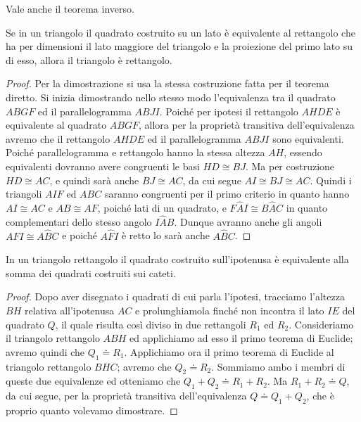 Vale anche il teorema inverso.
\begin{teorema}
Se in un triangolo il quadrato costruito su un lato è equivalente al rettangolo che ha per dimensioni il lato maggiore del triangolo e la proiezione del primo lato su di esso, allora il triangolo è rettangolo.
\end{teorema}

\begin{proof}
Per la dimostrazione si usa la stessa costruzione fatta per il teorema diretto. Si inizia dimostrando nello stesso modo l'equivalenza tra il quadrato $ABGF$ ed il parallelogramma $ABJI$. Poiché per ipotesi il rettangolo $AHDE$ è equivalente al quadrato $ABGF$, allora per la proprietà transitiva dell'equivalenza avremo che il rettangolo $AHDE$ ed il parallelogramma $ABJI$ sono equivalenti. Poiché parallelogramma e rettangolo hanno la stessa altezza $AH$, essendo equivalenti dovranno avere congruenti le basi $HD\cong BJ$. Ma per costruzione $HD\cong AC$, e quindi sarà anche $BJ\cong AC$, da cui segue $AI\cong BJ\cong AC$. Quindi i triangoli $AIF$ ed $ABC$ saranno congruenti per il primo criterio in quanto hanno $AI\cong AC$ e $AB\cong AF$, poiché lati di un quadrato, e $F\widehat{A}I\cong B\widehat{A}C$ in quanto complementari dello stesso angolo $I\widehat{A}B$. Dunque avranno anche gli angoli $A\widehat{F}I\cong A\widehat{B}C$ e poiché $A\widehat{F}I$ è retto lo sarà anche $A\widehat{B}C$.
\end{proof}

\begin{teorema}[di Pitagora]
In un triangolo rettangolo il quadrato costruito sull’ipotenusa è equivalente alla somma dei quadrati costruiti sui cateti.
\end{teorema}

\begin{proof}
Dopo aver disegnato i quadrati di cui parla l'ipotesi, tracciamo l'altezza $BH$ relativa all'ipotenusa $AC$ e prolunghiamola finché non incontra il lato $IE$ del quadrato $Q$, il quale risulta così diviso in due rettangoli $R_1$ ed $R_2$.
Consideriamo il triangolo rettangolo $ABH$ ed applichiamo ad esso il primo teorema di Euclide; avremo quindi che $Q_1\doteq R_1$. Applichiamo ora il primo teorema di Euclide al triangolo rettangolo $BHC$; avremo che $Q_2\doteq R_2$. Sommiamo ambo i membri di queste due equivalenze ed otteniamo che $Q_1+Q_2\doteq R_1+R_2$. Ma $R_1+R_2\doteq Q$, da cui segue, per la proprietà transitiva dell'equivalenza $Q\doteq Q_1+Q_2$, che è proprio quanto volevamo dimostrare.
\end{proof}

